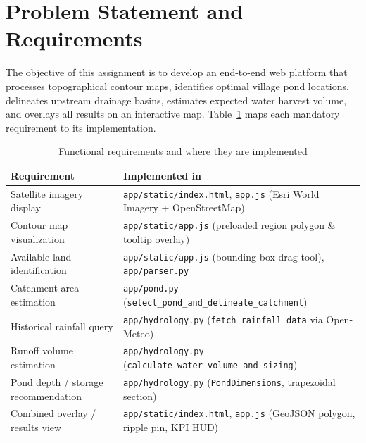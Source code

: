 \documentclass[manuscript,screen,review]{acmart}
\begin{document}
\section{Problem Statement and Requirements}
\label{sec:requirements}
The objective of this assignment is to develop an end-to-end web platform that processes topographical contour maps, identifies optimal village pond locations, delineates upstream drainage basins, estimates expected water harvest volume, and overlays all results on an interactive map. Table~\ref{tab:requirements} maps each mandatory requirement to its implementation.

\begin{table}[!ht]
\small
  \caption{Functional requirements and where they are implemented}
  \label{tab:requirements}
  \begin{tabular}{p{5.5cm}p{7.5cm}}
    \toprule
    Requirement & Implemented in \\
    \midrule
    Satellite imagery display & \texttt{app/static/index.html}, \texttt{app.js} (Esri World Imagery + OpenStreetMap) \\
    Contour map visualization & \texttt{app/static/app.js} (preloaded region polygon \& tooltip overlay) \\
    Available-land identification & \texttt{app/static/app.js} (bounding box drag tool), \texttt{app/parser.py} \\
    Catchment area estimation & \texttt{app/pond.py} (\texttt{select\_pond\_and\_delineate\_catchment}) \\
    Historical rainfall query & \texttt{app/hydrology.py} (\texttt{fetch\_rainfall\_data} via Open-Meteo) \\
    Runoff volume estimation & \texttt{app/hydrology.py} (\texttt{calculate\_water\_volume\_and\_sizing}) \\
    Pond depth / storage recommendation & \texttt{app/hydrology.py} (\texttt{PondDimensions}, trapezoidal section) \\
    Combined overlay / results view & \texttt{app/static/index.html}, \texttt{app.js} (GeoJSON polygon, ripple pin, KPI HUD) \\
    \bottomrule
  \end{tabular}
\end{table}
\end{document}
